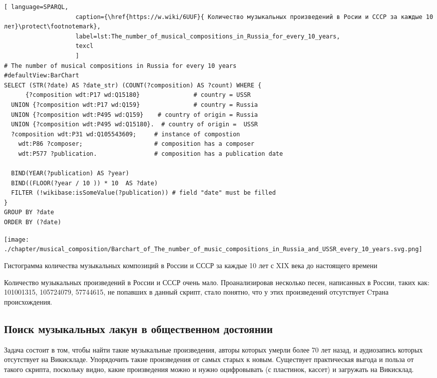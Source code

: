 \begin{lstlisting}[ language=SPARQL,
                    caption={\href{https://w.wiki/6UUF}{ Количество музыкальных произведений в Росии и СССР за каждые 10 лет}\protect\footnotemark},
                    label=lst:The_number_of_musical_compositions_in_Russia_for_every_10_years,
                    texcl 
                    ]
# The number of musical compositions in Russia for every 10 years
#defaultView:BarChart
SELECT (STR(?date) AS ?date_str) (COUNT(?composition) AS ?count) WHERE {
      {?composition wdt:P17 wd:Q15180}               # country = USSR
  UNION {?composition wdt:P17 wd:Q159}               # country = Russia
  UNION {?composition wdt:P495 wd:Q159}    # country of origin = Russia
  UNION {?composition wdt:P495 wd:Q15180}.  # country of origin =  USSR
  ?composition wdt:P31 wd:Q105543609;     # instance of compostion
    wdt:P86 ?composer;                    # composition has a composer
    wdt:P577 ?publication.                # composition has a publication date

  BIND(YEAR(?publication) AS ?year)
  BIND((FLOOR(?year / 10 )) * 10  AS ?date)
  FILTER (!wikibase:isSomeValue(?publication)) # field "date" must be filled
}
GROUP BY ?date
ORDER BY (?date)
\end{lstlisting}%

\begin{marginfigure}[0\baselineskip]
	\texttt{[image: ./chapter/musical\_composition/Barchart\_of\_The\_number\_of\_music\_compositions\_in\_Russia\_and\_USSR\_every\_10\_years.svg.png]}
	\caption[Гистограмма количества музыкальных композиций в России и СССР за каждые 10 лет с XIX века до настоящего времени]{Гистограмма количества музыкальных композиций в России и СССР за каждые 10 лет с XIX века до настоящего времени}%
\end{marginfigure}

Количество музыкальных произведений в России и СССР очень мало. Проанализировав несколько песен, написанных в России, таких как:  {101001315},   {105724079},  {57744615}, не попавших в данный скрипт, стало понятно, что у этих произведений отсутствует  {Cтрана происхождения}.

\subsection{Поиск музыкальных лакун в общественном достоянии}
Задача состоит в том, чтобы найти такие музыкальные произведения, авторы которых умерли более 70 лет назад, и аудиозапись которых отсутствует на Викискладе. Упорядочить такие произведения от самых старых к новым. Существует практическая выгода и польза от такого скрипта, поскольку видно, какие произведения можно и нужно оцифровывать (с пластинок, кассет) и загружать на Викисклад.

